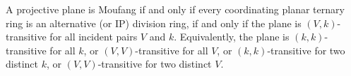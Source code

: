 A projective plane is Moufang if and only if every coordinating planar ternary ring is an alternative (or IP) division ring, if and only if the plane is $(V,k)$-transitive for all incident pairs $V$ and $k$. Equivalently, the plane is $(k,k)$-transitive for all $k$, or $(V,V)$-transitive for all $V$, or $(k,k)$-transitive for two distinct $k$, or $(V,V)$-transitive for two distinct $V$.

